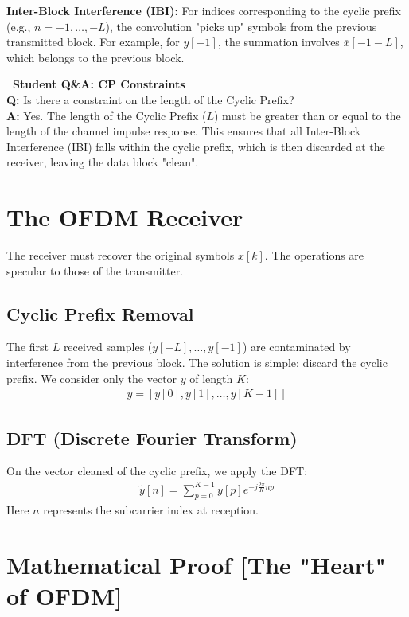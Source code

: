\documentclass[a4paper, 12pt]{book}
\begin{document}
\textbf{Inter-Block Interference (IBI):}
For indices corresponding to the cyclic prefix (e.g., $n = -1, \dots, -L$), the convolution "picks up" symbols from the previous transmitted block. For example, for $y[-1]$, the summation involves $\overline{x}[-1-L]$, which belongs to the previous block.

\noindent\colorbox{yellow!25}{
    \parbox{\dimexpr\linewidth-2\fboxsep}{
        \textbf{\faQuestionCircle\ Student Q\&A: CP Constraints} \\
        \small
        \textbf{Q:} Is there a constraint on the length of the Cyclic Prefix? \\
        \textbf{A:} Yes. The length of the Cyclic Prefix ($L$) must be greater than or equal to the length of the channel impulse response. This ensures that all Inter-Block Interference (IBI) falls within the cyclic prefix, which is then discarded at the receiver, leaving the data block "clean".
    }
}

\section{The OFDM Receiver}

The receiver must recover the original symbols $x[k]$. The operations are specular to those of the transmitter.

\subsection{Cyclic Prefix Removal}
The first $L$ received samples ($y[-L], \dots, y[-1]$) are contaminated by interference from the previous block. The solution is simple: discard the cyclic prefix.
We consider only the vector $y$ of length $K$:
\begin{align}
y = [y[0], y[1], \dots, y[K-1]]
\end{align}

\subsection{DFT (Discrete Fourier Transform)}
On the vector cleaned of the cyclic prefix, we apply the DFT:
\begin{align}
\tilde{y}[n] = \sum_{p=0}^{K-1} y[p] e^{-j \frac{2\pi}{K} np}
\end{align}
Here $n$ represents the subcarrier index at reception.

\section{Mathematical Proof [The "Heart" of OFDM]}
\end{document}
